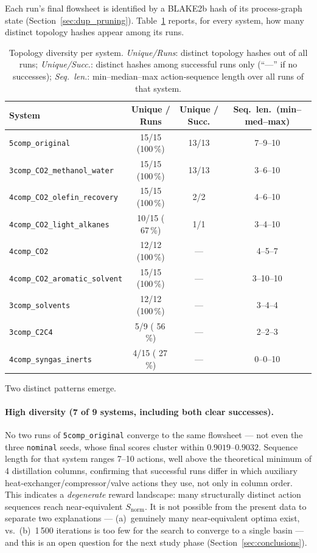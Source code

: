 \documentclass[11pt,a4paper]{article}
\theoremstyle{definition}
\theoremstyle{plain}
\begin{document}
Each run's final flowsheet is identified by a BLAKE2b hash of its process-graph state (Section~\ref{sec:dup_pruning}). Table~\ref{tab:topo_diversity} reports, for every system, how many distinct topology hashes appear among its runs.

\begin{table}[ht]
\centering
\caption{Topology diversity per system. \emph{Unique/Runs}: distinct topology hashes out of all runs; \emph{Unique/Succ.}: distinct hashes among successful runs only (``---'' if no successes); \emph{Seq.\ len.}: min--median--max action-sequence length over all runs of that system.}
\label{tab:topo_diversity}
\begin{tabular}{@{}lccc@{}}
\toprule
System & Unique / Runs & Unique / Succ. & Seq.\ len.\ (min--med--max) \\
\midrule
\texttt{5comp\_original}       & 15/15 (100\,\%) & 13/13 & 7--9--10 \\
\texttt{3comp\_CO2\_methanol\_water} & 15/15 (100\,\%) & 13/13 & 3--6--10 \\
\texttt{4comp\_CO2\_olefin\_recovery} & 15/15 (100\,\%) & 2/2 & 4--6--10 \\
\texttt{4comp\_CO2\_light\_alkanes}  & 10/15 ( 67\,\%) & 1/1 & 3--4--10 \\
\texttt{4comp\_CO2}          & 12/12 (100\,\%) & --- & 4--5--7 \\
\texttt{4comp\_CO2\_aromatic\_solvent}& 15/15 (100\,\%) & --- & 3--10--10 \\
\texttt{3comp\_solvents}       & 12/12 (100\,\%) & --- & 3--4--4 \\
\texttt{3comp\_C2C4}         & 5/9 ( 56\,\%) & --- & 2--2--3 \\
\texttt{4comp\_syngas\_inerts}    & 4/15 ( 27\,\%) & --- & 0--0--10 \\
\bottomrule
\end{tabular}
\end{table}

Two distinct patterns emerge.

\paragraph{High diversity (7 of 9 systems, including both clear successes).}
No two runs of \texttt{5comp\_original} converge to the same flowsheet — not even the three \texttt{nominal} seeds, whose final scores cluster within $0.9019$--$0.9032$. Sequence length for that system ranges 7--10 actions, well above the theoretical minimum of 4 distillation columns, confirming that successful runs differ in which auxiliary heat-exchanger/compressor/valve actions they use, not only in column order. This indicates a \emph{degenerate} reward landscape: many structurally distinct action sequences reach near-equivalent $S_{\mathrm{norm}}$. It is not possible from the present data to separate two explanations — (a)~genuinely many near-equivalent optima exist, vs.\ (b)~1\,500 iterations is too few for the search to converge to a single basin — and this is an open question for the next study phase (Section~\ref{sec:conclusions}).
\end{document}
